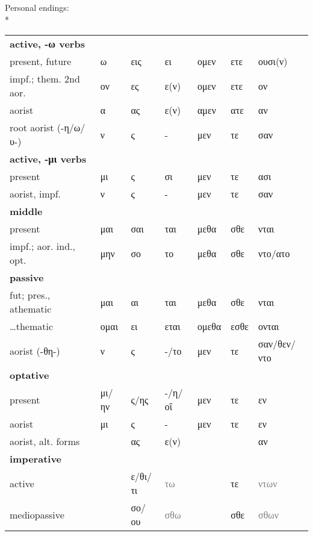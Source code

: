 \begin{small}
Personal endings:\\*
%
\begin{tabular}{lllllll}
\textbf{active, -ω verbs}\\
present, future              & ω      & εις\footnotemark  & ει\footnotemark[3]  & ομεν    & ετε    & ουσι(ν) \\
impf.; them. 2nd aor.        & ον\footnotemark[4] & ες      & ε(ν)      & ομεν    &	ετε    & ον\footnotemark[4] \\
aorist                       & α      & ας      & ε(ν)      & αμεν    & ατε    & αν\footnotemark[5] \\
root aorist (-η/ω/υ-)        & \tca{}ν & \tca{}ς  & \tca{}-  & \tca{}μεν & \tca{}τε & \tca{}σαν \\
\textbf{active, -μι verbs}\\
present                      & μι     & ς       & σι        & μεν     & τε     & ασι \\
aorist, impf.                & \tca{}ν & \tca{}ς  & \tca{}-  & \tca{}μεν & \tca{}τε & \tca{}σαν \\
\textbf{middle}\\
present                      & \tcb{}μαι & σαι  & \tcb{}ται & \tcb{}μεθα & \tcb{}σθε & \tcb{}νται \\
impf.; aor. ind., opt.       & μην    & σο      & το        & μεθα    &	σθε    & ντο/ατο\\
\textbf{passive}\\
fut; pres., athematic        & \tcb{}μαι  & αι  & \tcb{}ται & \tcb{}μεθα & \tcb{}σθε & \tcb{}νται \\
\ldots thematic              & ομαι   & ει\footnotemark[3] & εται      & ομεθα   & εσθε   & ονται \\
aorist (-θη-)                & \tca{}ν & \tca{}ς  & \tca{}-/το  & \tca{}μεν & \tca{}τε & \tca{}σαν/θεν/ντο \\
\textbf{optative}\\
present                      & μι/ην  & ς/ης    & -/η/οῖ    & μεν     & τε     & εν \\
aorist                       & μι     & ς       & -         & μεν     & τε     & εν \\
aorist, alt. forms           &        & ας      & ε(ν)      &         &        & αν \\
\textbf{imperative}\\
active                       &        & ε/θι/τι\footnotemark[6] & \textcolor{gray}{τω}        &         & τε     & \textcolor{gray}{ντων} \\
mediopassive                 &        & σο/ου      & \textcolor{gray}{σθω}       &         & σθε    & \textcolor{gray}{σθων} \\
\end{tabular}


\end{small}
